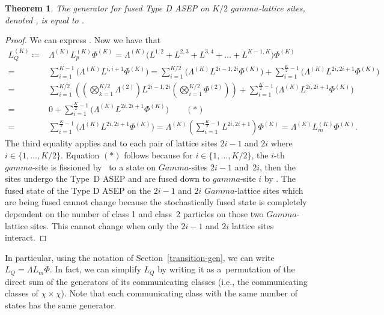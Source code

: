 \documentclass[10pt,a4paper]{amsart}
\numberwithin{equation}{section}
\newtheorem{Theorem}{Theorem}[section]
\theoremstyle{definition}
\def\Gamma{Gamma}
\def\gamma{gamma}
\begin{document}
\begin{Theorem}
\label{MiddleSwap}
The generator for fused Type D ASEP on $K/2$ $\gamma$-lattice sites, denoted , is equal to .
\end{Theorem}
\begin{proof}
 \label{MiddleSwapProof}
 We can express . Now we have that
 \begin{align*}
 L^{(K)}_Q\coloneqq{}& \Lambda^{(K)} L^{(K)}_p \Phi^{(K)} = \Lambda^{(K)} \bigl(L^{1,2}+L^{2,3}+L^{3,4}+\dots+L^{K-1,K}\bigr) \Phi^{(K)} \\
={}& \sum_{i=1}^{K-1}\bigl(\Lambda^{(K)}L^{i,i+1}\Phi^{(K)}\bigr) = \sum_{i=1}^{K/2} \bigl(\Lambda^{(K)}L^{2i-1,2i}\Phi^{(K)}\bigr) + \sum_{i=1}^{\frac{K}{2}-1} \bigl(\Lambda^{(K)}L^{2i,2i+1}\Phi^{(K)}\bigr) \\
={}&  \sum_{i=1}^{K/2} \left(\left(\bigotimes_{k=1}^{K/2} \Lambda^{(2)}\right)
 L^{2i-1,2i}\left(\bigotimes_{i=1}^{K/2} \Phi^{(2)}\right)\right) + \sum_{i=1}^{\frac{K}{2}-1} \bigl(\Lambda^{(K)}L^{2i,2i+1}\Phi^{(K)}\bigr) \\
={}&  0+\sum_{i=1}^{\frac{K}{2}-1} \bigl(\Lambda^{(K)}L^{2i,2i+1}\Phi^{(K)}\bigr) \hspace{2em} (*) \\
={}&  \sum_{i=1}^{\frac{K}{2}-1} \bigl(\Lambda^{(K)}L^{2i,2i+1}\Phi^{(K)}\bigr) = \Lambda^{(K)}\left(\sum_{i=1}^{\frac{K}{2}-1} L^{2i,2i+1}\right)\Phi^{(K)} = \Lambda^{(K)}L_m^{(K)}\Phi^{(K)}.
 \end{align*}
 The third equality applies  and  to each pair of lattice sites $2i-1$ and $2i$ where $i \in \{1,\dots ,K/2\}$. Equation $(*)$ follows because
 for $i \in \{1,\dots ,K/2\}$, the $i$-th $\gamma$-site is
fissioned by~ to a state on $\Gamma$-sites $2i-1$
and~$2i$, then the sites undergo the Type~D ASEP and are fused down
to $\gamma$-site $i$ by . The fused state of the Type D ASEP on the $2i-1$ and $2i$ $\Gamma$-lattice sites which are being fused cannot change because the stochastically fused state is completely dependent on the number of class 1 and class~2 particles on those two $\Gamma$-lattice sites. This cannot change when only the $2i-1$ and $2i$ lattice sites interact.
\end{proof}

In particular, using the notation of Section~\ref{transition-gen}, we can write $L_Q = \Lambda L_m \Phi$. In fact, we can simplify $L_Q$ by writing it as a~permutation of the direct sum of the generators of its communicating classes (i.e., the communicating classes of $\chi \times \chi$). Note that each communicating class with the same number of states has the same generator.
\end{document}
